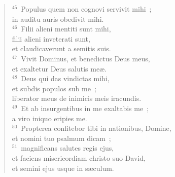 \begin{flushleft}
\begin{verse}
${}^{45}$~Populus quem non cognovi servivit mihi~;\\ in auditu auris obedivit mihi.\\
${}^{46}$~Filii alieni mentiti sunt mihi,\\ filii alieni inveterati sunt,\\ et claudicaverunt a semitis suis.\\
${}^{47}$~Vivit Dominus, et benedictus Deus meus,\\ et exaltetur Deus salutis me\ae .\\
${}^{48}$~Deus qui das vindictas mihi,\\ et subdis populos sub me~;\\ liberator meus de inimicis meis iracundis.\\
${}^{49}$~Et ab insurgentibus in me exaltabis me~;\\ a viro iniquo eripies me.\\
${}^{50}$~Propterea confitebor tibi in nationibus, Domine,\\ et nomini tuo psalmum dicam~;\\
${}^{51}$~magnificans salutes regis ejus,\\ et faciens misericordiam christo suo David,\\ et semini ejus usque in s\ae culum.\end{verse}\end{flushleft}


